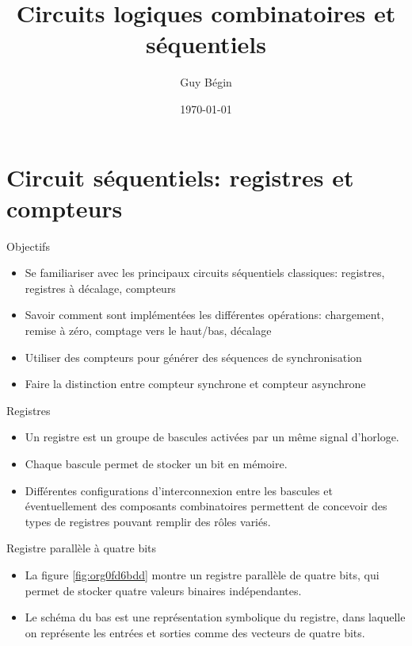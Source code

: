 \documentclass[presentation]{beamer}
\author{Guy Bégin}
\date{\today}
\title{Circuits logiques combinatoires et séquentiels}
\begin{document}
\maketitle

\section{Circuit séquentiels: registres et compteurs}
\label{sec:orge3c1809}
\begin{frame}[label={sec:org8dde97a}]{Objectifs}
\begin{itemize}
\item Se familiariser avec les principaux circuits séquentiels classiques:
registres, registres à décalage, compteurs
\item Savoir comment sont implémentées les différentes opérations:
chargement, remise à zéro, comptage vers le haut/bas, décalage
\item Utiliser des compteurs pour générer des séquences de
synchronisation
\item Faire la distinction entre compteur synchrone et compteur asynchrone
\end{itemize}
\end{frame}

\begin{frame}[label={sec:org017f76d}]{Registres}
\begin{itemize}
\item Un registre est un groupe de bascules activées par un même signal d'horloge.

\item Chaque bascule permet de stocker un bit en mémoire.

\item Différentes configurations d'interconnexion entre les bascules et éventuellement des composants combinatoires permettent de concevoir des types de registres pouvant remplir des rôles variés.
\end{itemize}
\end{frame}

\begin{frame}[label={sec:org4acff50}]{Registre parallèle à quatre bits}
\begin{itemize}
\item La figure \ref{fig:org0fd6bdd} montre un registre parallèle de quatre bits, qui permet de stocker quatre valeurs binaires indépendantes.

\item Le schéma du bas est une représentation symbolique du registre, dans laquelle on représente les entrées et sorties comme des vecteurs de quatre bits.
\end{itemize}
\end{frame}
\end{document}
